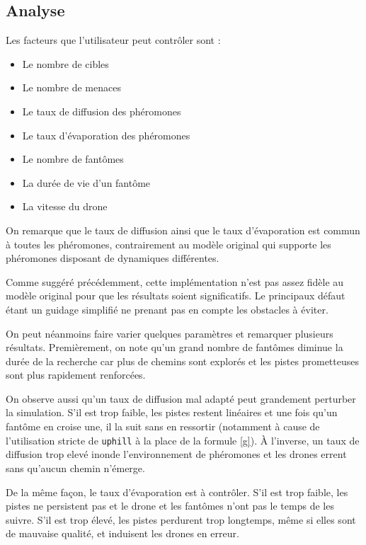 \documentclass[12pt]{article}
\begin{document}
\subsection{Analyse}

Les facteurs que l'utilisateur peut contrôler sont :

\begin{itemize}
\item{Le nombre de cibles}
\item{Le nombre de menaces}
\item{Le taux de diffusion des phéromones}
\item{Le taux d'évaporation des phéromones}
\item{Le nombre de fantômes}
\item{La durée de vie d'un fantôme}
\item{La vitesse du drone}
\end{itemize}

On remarque que le taux de diffusion ainsi que le taux d'évaporation
est commun à toutes les phéromones, contrairement au modèle original
qui supporte les phéromones disposant de dynamiques différentes.

Comme suggéré précédemment, cette implémentation n'est pas assez
fidèle au modèle original pour que les résultats soient
significatifs. Le principaux défaut étant un guidage simplifié ne
prenant pas en compte les obstacles à éviter.

On peut néanmoins faire varier quelques paramètres et remarquer
plusieurs résultats. Premièrement, on note qu'un grand nombre de
fantômes diminue la durée de la recherche car plus de chemins sont
explorés et les pistes prometteuses sont plus rapidement renforcées.

On observe aussi qu'un taux de diffusion mal adapté peut grandement
perturber la simulation. S'il est trop faible, les pistes restent
linéaires et une fois qu'un fantôme en croise une, il la suit sans en
ressortir (notamment à cause de l'utilisation stricte de
\texttt{uphill} à la place de la formule \ref{g}). \`A l'inverse, un
taux de diffusion trop elevé inonde l'environnement de phéromones et
les drones errent sans qu'aucun chemin n'émerge.

De la même façon, le taux d'évaporation est à contrôler. S'il est trop
faible, les pistes ne persistent pas et le drone et les fantômes n'ont
pas le temps de les suivre. S'il est trop élevé, les pistes perdurent
trop longtemps, même si elles sont de mauvaise qualité, et induisent
les drones en erreur.
\end{document}
